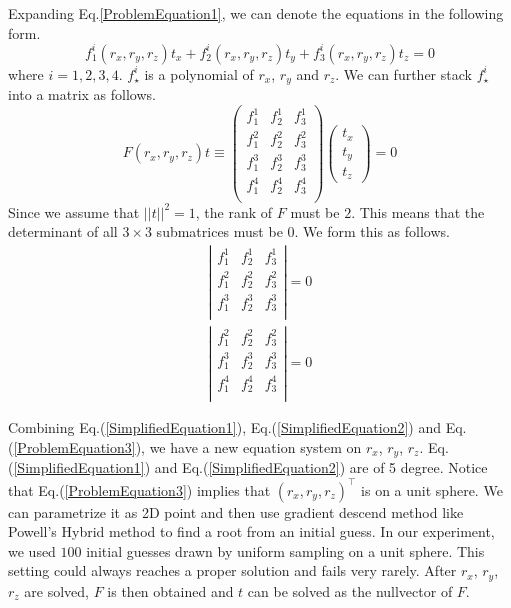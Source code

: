 \documentclass[letterpaper, 10 pt, conference]{ieeeconf}
\begin{document}
Expanding Eq.\ref{ProblemEquation1}, we can denote the equations in the following form. 
\begin{equation}
f_1^i(r_x, r_y, r_z) t_x + f_2^i(r_x, r_y, r_z) t_y + f_3^i(r_x, r_y, r_z) t_z = 0
\end{equation}
where $i = 1, 2, 3, 4$. $f_\star^i$ is a polynomial of $r_x$, $r_y$ and $r_z$. We can further stack $f_\star^i$ into a matrix as follows. 
\begin{equation}
F(r_x, r_y, r_z) t \equiv \left( 
	\begin{array}{clr}
	f_1^1 & f_2^1 & f_3^1 \\
	f_1^2 & f_2^2 & f_3^2 \\
	f_1^3 & f_2^3 & f_3^3 \\
	f_1^4 & f_2^4 & f_3^4 \\	
	\end{array}
\right) \left(
	\begin{array}{clr}
	t_x \\ t_y \\t_z
	\end{array}
\right) = 0	
\end{equation}
Since we assume that $||t||^2 = 1$, the rank of $F$ must be $2$. This means that the determinant of all $3 \times 3$ submatrices must be 0. We form this as follows. 
\begin{eqnarray}
\label{SimplifiedEquation1}
\left| 
	\begin{array}{clr}
	f_1^1 & f_2^1 & f_3^1 \\
	f_1^2 & f_2^2 & f_3^2 \\
	f_1^3 & f_2^3 & f_3^3 \\
	\end{array}
\right| = 0 \\ 
\label{SimplifiedEquation2}
\left| 
	\begin{array}{clr}
	f_1^2 & f_2^2 & f_3^2 \\
	f_1^3 & f_2^3 & f_3^3 \\
	f_1^4 & f_2^4 & f_3^4 \\	
	\end{array}
\right| = 0 
\end{eqnarray}

Combining Eq.(\ref{SimplifiedEquation1}), Eq.(\ref{SimplifiedEquation2}) and Eq.(\ref{ProblemEquation3}), we have a new equation system on $r_x$, $r_y$, $r_z$. Eq.(\ref{SimplifiedEquation1}) and Eq.(\ref{SimplifiedEquation2}) are of 5 degree. Notice that Eq.(\ref{ProblemEquation3}) implies that $(r_x, r_y, r_z)^\top$ is on a unit sphere. We can parametrize it as 2D point and then use gradient descend method like Powell's Hybrid method to find a root from an initial guess. In our experiment, we used $100$ initial guesses drawn by uniform sampling on a unit sphere. This setting could always reaches a proper solution and fails very rarely. After $r_x$, $r_y$, $r_z$ are solved, $F$ is then obtained and $t$ can be solved as the nullvector of $F$. 
\end{document}
